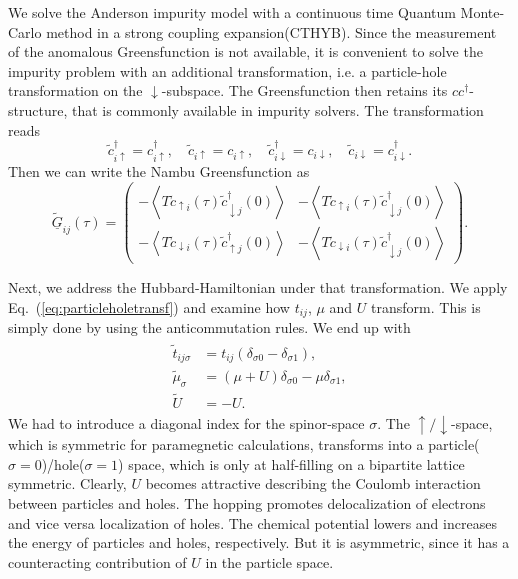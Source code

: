 \documentclass[aps,prb,twocolumn,groupedaddress,amsmath,amssymb]{revtex4-1}
\newcommand{\up}{\uparrow}
\newcommand{\dn}{\downarrow}
\newcommand{\refeq}[1]{Eq.~(\ref{#1})}
\newcommand{\expectv}[1]{\left< #1 \right>}
\newcommand{\Nambu}[1]{\underline{#1}}
\begin{document}
We solve the Anderson impurity model with a continuous time Quantum Monte-Carlo method in a strong coupling expansion(CTHYB).\cite{Parcollet2015,Seth2016} Since the measurement of the anomalous Greensfunction is not available, it is convenient to solve the impurity problem with an additional transformation, i.e. a particle-hole transformation on the $\dn$-subspace. The Greensfunction then retains its $cc^\dagger$-structure, that is commonly available in impurity solvers. The transformation reads
\begin{equation}
  \label{eq:particleholetransf}
  \tilde{c}^\dagger_{i\up}=c^\dagger_{i\up},\quad \tilde{c}_{i\up}=c_{i\up},\quad\tilde{c}^\dagger_{i\dn}=c_{i\dn},\quad \tilde{c}_{i\dn}=c^\dagger_{i\dn}.
\end{equation}
Then we can write the Nambu Greensfunction as
\begin{equation}
  \label{eq:nambugfph}
  \tilde{\Nambu{G}}_{ij}(\tau)=\begin{pmatrix}-\expectv{T\tilde{c}_{\up i}(\tau)\tilde{c}^\dagger_{\dn j}(0)}&-\expectv{T\tilde{c}_{\up i}(\tau)\tilde{c}^\dagger_{\dn j}(0)}\\-\expectv{T\tilde{c}_{\dn i}(\tau)\tilde{c}^\dagger_{\up j}(0)}&-\expectv{T\tilde{c}_{\dn i}(\tau)\tilde{c}^\dagger_{\dn j}(0)}\end{pmatrix}.
\end{equation}

Next, we address the Hubbard-Hamiltonian under that transformation. We apply \refeq{eq:particleholetransf} and examine how $t_{ij}$, $\mu$ and $U$ transform. This is simply done by using the anticommutation rules. We end up with
\begin{align}
  \label{eq:nambuhubbard}
  \begin{split}
    \tilde{t}_{ij\sigma}&=t_{ij}\left(\delta_{\sigma 0}-\delta_{\sigma 1}\right),\\
    \tilde{\mu}_\sigma&=\left(\mu+U\right)\delta_{\sigma 0}-\mu\delta_{\sigma 1},\\
    \tilde{U}&=-U.
  \end{split}
\end{align}
We had to introduce a diagonal index for the spinor-space $\sigma$. The $\up /\dn$-space, which is symmetric for paramegnetic calculations, transforms into a particle($\sigma=0$)/hole($\sigma=1$) space, which is only at half-filling on a bipartite lattice symmetric. Clearly, $U$ becomes attractive describing the Coulomb interaction between particles and holes. The hopping promotes delocalization of electrons and vice versa localization of holes. The chemical potential lowers and increases the energy of particles and holes, respectively. But it is asymmetric, since it has a counteracting contribution of $U$ in the particle space.
\end{document}
